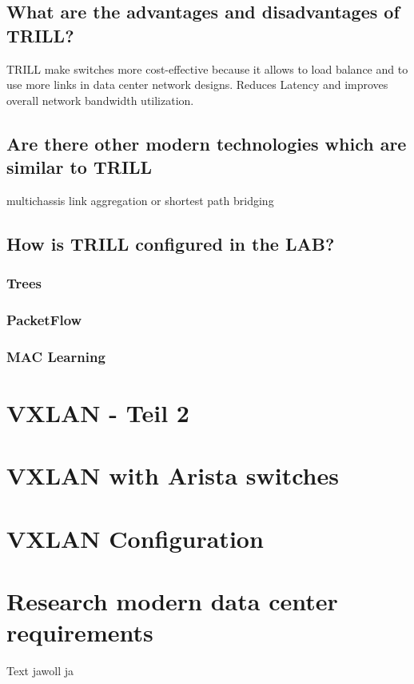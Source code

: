 \documentclass[a4,12pt]{scrartcl}
\begin{document}
\subsection{What are the advantages and disadvantages of TRILL?}
TRILL make switches more cost-effective because it allows to load balance and to use more links in data center network designs.
Reduces Latency and improves overall network bandwidth utilization.
\subsection{Are there other modern technologies which are similar to TRILL} multichassis link aggregation or shortest path bridging
\subsection{How is TRILL configured in the LAB?}
\subsubsection{Trees}
\subsubsection{PacketFlow}
\subsubsection{MAC Learning} 
\newpage
\section{VXLAN - Teil 2}
\section{VXLAN with Arista switches}
\section{VXLAN Configuration}
\section{Research modern data center requirements}
Text jawoll ja
\end{document}
